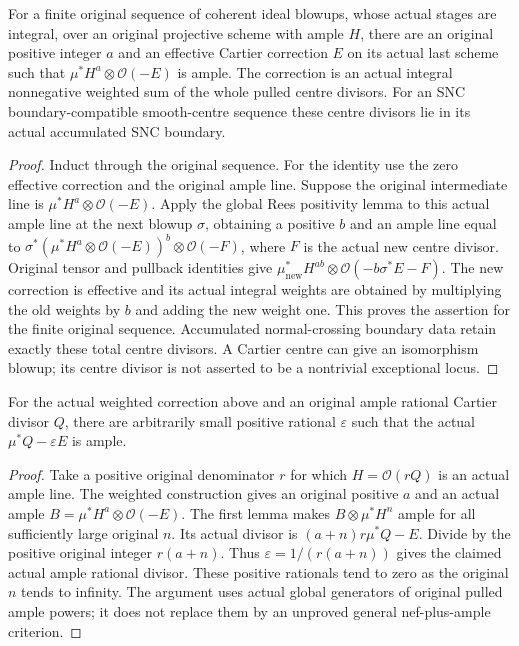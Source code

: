 \begin{lemma}
\label{lem:kn-nadel-nef-big-weighted-correction}
\notready
For a finite original sequence of coherent ideal blowups, whose actual
stages are integral, over an original projective scheme with ample $H$, there are an original positive integer
$a$ and an effective Cartier correction $E$ on its actual last scheme
such that $\mu^*H^a\otimes\mathcal O(-E)$ is ample. The correction is
an actual integral nonnegative weighted sum of the whole pulled centre
divisors. For an SNC boundary-compatible smooth-centre sequence these
centre divisors lie in its actual accumulated SNC boundary.
\end{lemma}
\begin{proof}
Induct through the original sequence. For the identity use the zero
effective correction and the original ample line. Suppose the original
intermediate line is $\mu^*H^a\otimes\mathcal O(-E)$. Apply the global
Rees positivity lemma to this actual ample line at the next blowup
$\sigma$, obtaining a positive $b$ and an ample line equal to
$\sigma^*(\mu^*H^a\otimes\mathcal O(-E))^b\otimes\mathcal O(-F)$,
where $F$ is the actual new centre divisor. Original tensor and pullback
identities give $\mu_{\mathrm{new}}^*H^{ab}\otimes
\mathcal O(-b\sigma^*E-F)$. The new correction is effective and its
actual integral weights are obtained by multiplying the old weights by
$b$ and adding the new weight one. This proves the assertion for the
finite original sequence. Accumulated normal-crossing boundary data
retain exactly these total centre divisors. A Cartier centre can give
an isomorphism blowup; its centre divisor is not asserted to be a
nontrivial exceptional locus.
\end{proof}

\begin{lemma}
\label{lem:kn-nadel-nef-big-small-ample-correction}
\notready
For the actual weighted correction above and an original ample rational
Cartier divisor $Q$, there are arbitrarily small positive rational
$\varepsilon$ such that the actual $\mu^*Q-\varepsilon E$ is ample.
\end{lemma}
\begin{proof}
Take a positive original denominator $r$ for which $H=\mathcal O(rQ)$
is an actual ample line. The weighted construction gives an original
positive $a$ and an actual ample $B=\mu^*H^a\otimes\mathcal O(-E)$.
The first lemma makes $B\otimes\mu^*H^n$ ample for all sufficiently
large original $n$. Its actual divisor is $(a+n)r\mu^*Q-E$.
Divide by the positive original integer $r(a+n)$. Thus
$\varepsilon=1/(r(a+n))$ gives the claimed actual ample rational divisor.
These positive rationals tend to zero as the original $n$ tends to infinity.
The argument uses actual global generators of original pulled ample powers;
it does not replace them by an unproved general nef-plus-ample criterion.
\end{proof}

